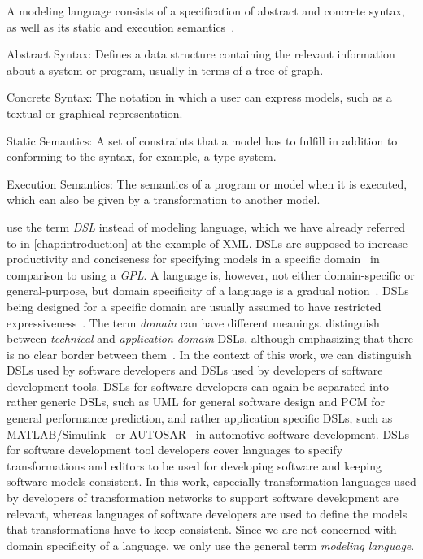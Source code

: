 A modeling language consists of a specification of abstract and concrete syntax, as well as its static and execution semantics~\cite[p.~26]{voelter2013DslEngineering}.
\begin{properdescription}
    \item[Abstract Syntax:] Defines a data structure containing the relevant information about a system or program, usually in terms of a tree of graph.
    \item[Concrete Syntax:] The notation in which a user can express models, such as a textual or graphical representation.
    \item[Static Semantics:] A set of constraints that a model has to fulfill in addition to conforming to the syntax, for example, a type system.
    \item[Execution Semantics:] The semantics of a program or model when it is executed, which can also be given by a transformation to another model. 
\end{properdescription}

\textcite{voelter2013DslEngineering} use the term \emph{\gls{DSL}} instead of modeling language, which we have already referred to in \autoref{chap:introduction} at the example of \gls{XML}.
\Glspl{DSL} are supposed to increase productivity and conciseness for specifying models in a specific domain~\cite[p.~30]{voelter2013DslEngineering} in comparison to using a \emph{\gls{GPL}}.
A language is, however, not either domain-specific or general-purpose, but domain specificity of a language is a gradual notion~\cite[p.~30]{voelter2013DslEngineering}.
\Glspl{DSL} being designed for a specific domain are usually assumed to have restricted expressiveness~\cite[Chap.~2]{fowler2010dsls-Book}.
The term \emph{domain} can have different meanings.
\citeauthor{voelter2013DslEngineering} distinguish between \emph{technical} and \emph{application domain} \glspl{DSL}, although emphasizing that there is no clear border between them~\cite[p.~26]{voelter2013DslEngineering}.
In the context of this work, we can distinguish \glspl{DSL} used by software developers and \glspl{DSL} used by developers of software development tools.
\glspl{DSL} for software developers can again be separated into rather generic \glspl{DSL}, such as \gls{UML} for general software design and \gls{PCM} for general performance prediction, and rather application specific \glspl{DSL}, such as MATLAB/Simulink~\cite{simulink} or AUTOSAR~\cite{scheid2015autosar} in automotive software development.
\glspl{DSL} for software development tool developers cover languages to specify transformations and editors to be used for developing software and keeping software models consistent.
In this work, especially transformation languages used by developers of transformation networks to support software development are relevant, whereas languages of software developers are used to define the models that transformations have to keep consistent.
Since we are not concerned with domain specificity of a language, we only use the general term \emph{modeling language}.

